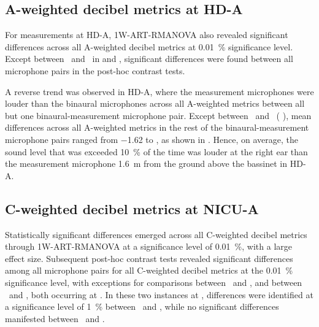 \subsection{A-weighted decibel metrics at HD-A}

For measurements at HD-A, 1W-ART-RMANOVA also revealed significant differences across all A-weighted decibel metrics at \SI{0.01}{\percent} significance level. Except between \binL\ and \binR\ in  and , significant differences were found between all microphone pairs in the post-hoc contrast tests. 

A reverse trend was observed in HD-A, where the measurement microphones were louder than the binaural microphones across all A-weighted metrics between all but one binaural-measurement microphone pair. Except between \binR\ and \GRASOut\ ( \dba{}), mean differences across all A-weighted metrics in the rest of the binaural-measurement microphone pairs ranged from \num{-1.62} to , as shown in . Hence, on average, the sound level that was exceeded \SI{10}{\percent} of the time was louder at the right ear than the measurement microphone \SI{1.6}{\meter} from the ground above the bassinet in HD-A. 



\subsection{C-weighted decibel metrics at NICU-A}

Statistically significant differences emerged across all C-weighted decibel metrics through 1W-ART-RMANOVA at a significance level of \SI{0.01}{\percent}, with a large effect size. Subsequent post-hoc contrast tests revealed significant differences among all microphone pairs for all C-weighted decibel metrics at the \SI{0.01}{\percent} significance level, with exceptions for comparisons between \binL\ and \binR, and between \GRASOut\ and \binR, both occurring at . In these two instances at , differences were identified at a significance level of \SI{1}{\percent} between \binL\ and \binR, while no significant differences manifested between \GRASOut\ and \binR. 

